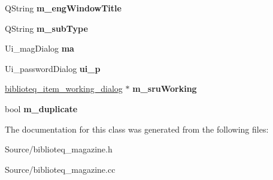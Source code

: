 \begin{DoxyCompactItemize}
\item 
Q\+String {\bfseries m\+\_\+eng\+Window\+Title}\hypertarget{classbiblioteq__magazine_a5ee1f5830c82adf6f9e2a01f1e9b084e}{}\label{classbiblioteq__magazine_a5ee1f5830c82adf6f9e2a01f1e9b084e}

\item 
Q\+String {\bfseries m\+\_\+sub\+Type}\hypertarget{classbiblioteq__magazine_a022e8b83ecf4c0d71d55b82f91aafc04}{}\label{classbiblioteq__magazine_a022e8b83ecf4c0d71d55b82f91aafc04}

\item 
Ui\+\_\+mag\+Dialog {\bfseries ma}\hypertarget{classbiblioteq__magazine_a2882fe0804626976a30c4276db27cf27}{}\label{classbiblioteq__magazine_a2882fe0804626976a30c4276db27cf27}

\item 
Ui\+\_\+password\+Dialog {\bfseries ui\+\_\+p}\hypertarget{classbiblioteq__magazine_ab158ab3dd515fa0b54d70da11cabd091}{}\label{classbiblioteq__magazine_ab158ab3dd515fa0b54d70da11cabd091}

\item 
\hyperlink{classbiblioteq__item__working__dialog}{biblioteq\+\_\+item\+\_\+working\+\_\+dialog} $\ast$ {\bfseries m\+\_\+sru\+Working}\hypertarget{classbiblioteq__magazine_aca999487ac2250ea5bcecd11ab9835b2}{}\label{classbiblioteq__magazine_aca999487ac2250ea5bcecd11ab9835b2}

\item 
bool {\bfseries m\+\_\+duplicate}\hypertarget{classbiblioteq__magazine_ac80146dd2c8a55cf4dcca59abca320d1}{}\label{classbiblioteq__magazine_ac80146dd2c8a55cf4dcca59abca320d1}

\end{DoxyCompactItemize}


The documentation for this class was generated from the following files\+:\begin{DoxyCompactItemize}
\item 
Source/biblioteq\+\_\+magazine.\+h\item 
Source/biblioteq\+\_\+magazine.\+cc\end{DoxyCompactItemize}
